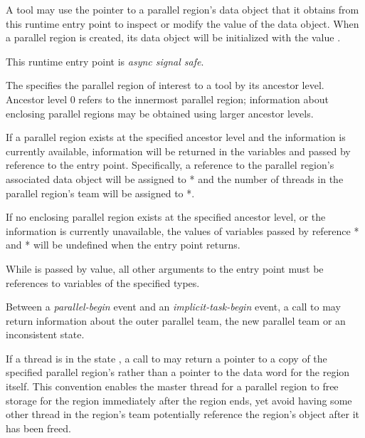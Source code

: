 A tool may use the pointer to a parallel region's data object that it
obtains from this runtime entry point to inspect or modify the value
of the data object.  When a parallel region is created, its data
object will be initialized with the value .

This runtime entry point is \emph{async signal safe}.

\argdesc

The \callbackarg{}  specifies the parallel region
of interest to a tool by its ancestor level.  Ancestor level 0 refers
to the innermost parallel region; information about enclosing parallel
regions may be obtained using larger ancestor levels.

If a parallel region exists at the specified ancestor level
and the information is currently available,
information will be returned in the variables  and
 passed by reference to the entry point.
Specifically, a reference to the parallel region's associated data
object will be assigned to * and the number of
threads in the parallel region's team will be assigned to
*.

If no enclosing parallel region exists at the specified ancestor
level, or the information is currently unavailable,
the values of variables passed by reference
* and * will be undefined when the
entry point returns.

\constraints
While \callbackarg{}  is passed by
value, all other arguments to the entry point must be references
to variables of the specified types.


\restrictions
Between a \emph{parallel-begin} event and an \emph{implicit-task-begin}
event, a call to  may return
information about the outer parallel team, the new parallel team or an
inconsistent state.

If a thread is in the state ,
a call to 
may return a pointer to a copy of the specified parallel region's 
rather than a pointer to the data word for the region itself. This convention enables the master thread
for a parallel region to free storage for the region immediately after the region ends, yet
avoid having some other thread in the region's team
potentially reference the region's  object after it has been freed.

